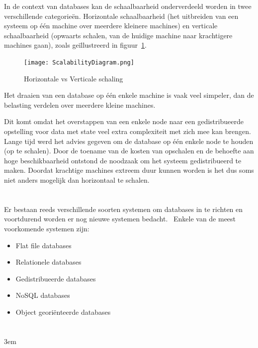 In de context van databases kan de schaalbaarheid onderverdeeld worden in twee verschillende categorieën. Horizontale schaalbaarheid (het uitbreiden van een systeem op één machine over meerdere kleinere machines) en verticale schaalbaarheid (opwaarts schalen, van de huidige machine naar krachtigere machines gaan), zoals geïllustreerd in figuur~\ref{fig:scalability}. 

\begin{figure}[H]
    \centering
    \texttt{[image: ScalabilityDiagram.png]}
    \caption[Horizontale vs Verticale schaling]{Horizontale vs Verticale schaling ~\autocite{ScyllaDB}}
    \label{fig:scalability}
\end{figure}

Het draaien van een database op één enkele machine is vaak veel simpeler, dan de belasting verdelen over meerdere kleine machines.

Dit komt omdat het overstappen van een enkele node naar een gedistribueerde opstelling voor data met state veel extra complexiteit met zich mee kan brengen. Lange tijd werd het advies gegeven om de database op één enkele node te houden (op te schalen). Door de toename van de kosten van opschalen en de behoefte aan hoge beschikbaarheid ontstond de noodzaak om het systeem gedistribueerd te maken. Doordat krachtige machines extreem duur kunnen worden is het dus soms niet anders mogelijk dan horizontaal te schalen.~\autocite{Kleppmann2017} 

\section{}%
\label{sec:soorten-databases}

Er bestaan reeds verschillende soorten systemen om databases in te richten en voortdurend worden er nog nieuwe systemen bedacht.~\autocite{ictportal2022} Enkele van de meest voorkomende systemen zijn:
\begin{itemize}
      \item Flat file databases
      \item Relationele databases
      \item Gedistribueerde databases
      \item NoSQL databases
      \item Object georiënteerde databases
\end{itemize}

\newpage

\section{}%
\emergencystretch 3em
\label{sec:flat-file-database}

